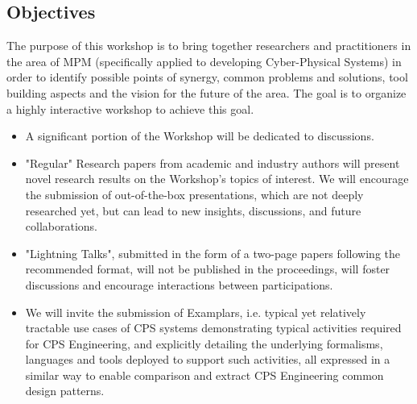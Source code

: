 \subsection{Objectives}
The purpose of this workshop is to bring together researchers and practitioners 
in the area of MPM (specifically applied to developing Cyber-Physical Systems) in 
order to identify possible points of synergy, common problems and solutions, 
tool building aspects and the vision for the future of the area.
The goal is to organize a highly interactive workshop to achieve this goal.
\begin{itemize}
    \item A significant portion of the Workshop will be dedicated to discussions.
    \item "Regular" Research papers from academic and industry authors will present
    novel research results on the Workshop's topics of interest. We will encourage
    the submission of out-of-the-box presentations, which are not deeply researched 
    yet, but can lead to new insights, discussions, and future collaborations.
    \item "Lightning Talks", submitted in the form of a two-page papers following the
    recommended format, will not be published in the proceedings, will foster discussions
    and encourage interactions between participations. 
    \item We will invite the submission of Examplars, i.e. typical yet relatively
    tractable use cases of CPS systems demonstrating typical activities required for 
    CPS Engineering, and explicitly detailing the underlying formalisms, languages and 
    tools deployed to support such activities, all expressed in a similar way to enable
    comparison and extract CPS Engineering common design patterns.
\end{itemize}


